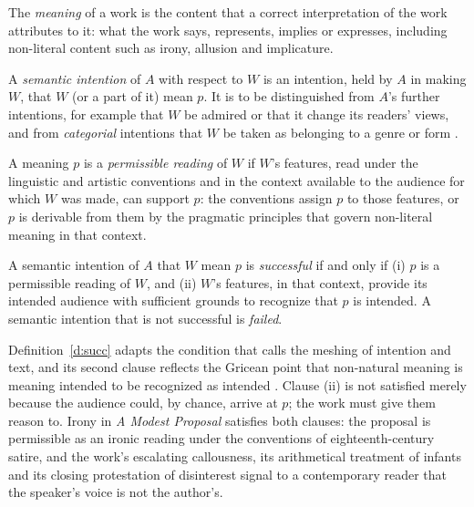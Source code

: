 \documentclass{situationist-preprint}
\begin{document}
\begin{definition}\label{d:wm}
The \emph{meaning} of a work is the content that a correct interpretation of the work attributes to it: what the work says, represents, implies or expresses, including non-literal content such as irony, allusion and implicature.
\end{definition}

\begin{definition}\label{d:si}
A \emph{semantic intention} of $A$ with respect to $W$ is an intention, held by $A$ in making $W$, that $W$ (or a part of it) mean $p$. It is to be distinguished from $A$'s further intentions, for example that $W$ be admired or that it change its readers' views, and from \emph{categorial} intentions that $W$ be taken as belonging to a genre or form \citep{Levinson1992}.
\end{definition}

\begin{definition}\label{d:perm}
A meaning $p$ is a \emph{permissible reading} of $W$ if $W$'s features, read under the linguistic and artistic conventions and in the context available to the audience for which $W$ was made, can support $p$: the conventions assign $p$ to those features, or $p$ is derivable from them by the pragmatic principles that govern non-literal meaning in that context.
\end{definition}

\begin{definition}[Success]\label{d:succ}
A semantic intention of $A$ that $W$ mean $p$ is \emph{successful} if and only if (i) $p$ is a permissible reading of $W$, and (ii) $W$'s features, in that context, provide its intended audience with sufficient grounds to recognize that $p$ is intended. A semantic intention that is not successful is \emph{failed}.
\end{definition}

Definition~\ref{d:succ} adapts the condition that \citet{Livingston2005} calls the meshing of intention and text, and its second clause reflects the Gricean point that non-natural meaning is meaning intended to be recognized as intended \citep{Grice1957}. Clause (ii) is not satisfied merely because the audience could, by chance, arrive at $p$; the work must give them reason to. Irony in \emph{A Modest Proposal} satisfies both clauses: the proposal is permissible as an ironic reading under the conventions of eighteenth-century satire, and the work's escalating callousness, its arithmetical treatment of infants and its closing protestation of disinterest signal to a contemporary reader that the speaker's voice is not the author's.
\end{document}
